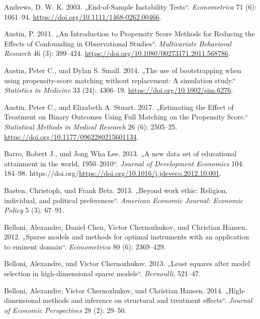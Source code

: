 \documentclass[
  a4paper,
  DIV=11,
  oneside]{scrreprt}
\newlength{\cslhangindent}
\newenvironment{CSLReferences}[2] %
 {\begin{list}{}{%
  \setlength{\itemindent}{0pt}
  \setlength{\leftmargin}{0pt}
  \setlength{\parsep}{0pt}
  \ifodd #1
   \setlength{\leftmargin}{\cslhangindent}
   \setlength{\itemindent}{-1\cslhangindent}
  \fi
  \setlength{\itemsep}{#2\baselineskip}}}
 {\end{list}}
\begin{document}
\begin{CSLReferences}{1}{0}
Andrews, D. W. K. 2003. {„End-of-Sample Instability Tests``}.
\emph{Econometrica} 71 (6): 1661--94.
\url{https://doi.org/10.1111/1468-0262.00466}.

Austin, P. 2011. {„An Introduction to Propensity Score Methods for
Reducing the Effects of Confounding in Observational Studies``}.
\emph{Multivariate Behavioral Research} 46 (3): 399--424.
\url{https://doi.org/10.1080/00273171.2011.568786}.

Austin, Peter C., und Dylan S. Small. 2014. {„The use of bootstrapping
when using propensity-score matching without replacement: A simulation
study.``} \emph{Statistics in Medicine} 33 (24): 4306--19.
\url{https://doi.org/10.1002/sim.6276}.

Austin, Peter C., und Elizabeth A. Stuart. 2017. {„Estimating the Effect
of Treatment on Binary Outcomes Using Full Matching on the Propensity
Score.``} \emph{Statistical Methods in Medical Research} 26 (6):
2505--25. \url{https://doi.org/10.1177/0962280215601134}.

Barro, Robert J., und Jong Wha Lee. 2013. {„A new data set of
educational attainment in the world, 1950--2010``}. \emph{Journal of
Development Economics} 104: 184--98.
https://doi.org/\url{https://doi.org/10.1016/j.jdeveco.2012.10.001}.

Basten, Christoph, und Frank Betz. 2013. {„Beyond work ethic: Religion,
individual, and political preferences``}. \emph{American Economic
Journal: Economic Policy} 5 (3): 67--91.

Belloni, Alexandre, Daniel Chen, Victor Chernozhukov, und Christian
Hansen. 2012. {„Sparse models and methods for optimal instruments with
an application to eminent domain``}. \emph{Econometrica} 80 (6):
2369--429.

Belloni, Alexandre, und Victor Chernozhukov. 2013. {„Least squares after
model selection in high-dimensional sparse models``}. \emph{Bernoulli},
521--47.

Belloni, Alexandre, Victor Chernozhukov, und Christian Hansen. 2014.
{„High-dimensional methods and inference on structural and treatment
effects``}. \emph{Journal of Economic Perspectives} 28 (2): 29--50.


\end{CSLReferences}
\end{document}
